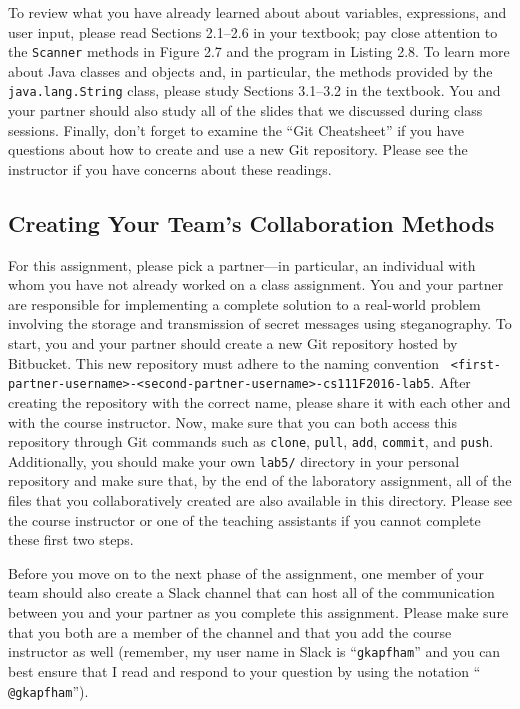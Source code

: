 To review what you have already learned about about variables, expressions, and user input, please read Sections
2.1--2.6 in your textbook; pay close attention to the {\tt Scanner} methods in Figure 2.7 and the program in Listing
2.8. To learn more about Java classes and objects and, in particular, the methods provided by the {\tt java.lang.String}
class, please study Sections 3.1--3.2 in the textbook. You and your partner should also study all of the slides that we
discussed during class sessions. Finally, don't forget to examine the ``Git Cheatsheet'' if you have questions about how
to create and use a new Git repository. Please see the instructor if you have concerns about these readings.

\vspace{-0.05in}
\subsection*{Creating Your Team's Collaboration Methods}
\vspace{-0.05in}

For this assignment, please pick a partner---in particular, an individual with whom you have not already worked on a class
assignment. You and your partner are responsible for implementing a complete solution to a real-world problem involving
the storage and transmission of secret messages using steganography. To start, you and your partner should create a new
Git repository hosted by Bitbucket. This new repository must adhere to the naming convention {\tt
<first-partner-username>-<second-partner-username>-cs111F2016-lab5}. After creating the repository with the correct
name, please share it with each other and with the course instructor. Now, make sure that you can both access this
repository through Git commands such as {\tt clone}, {\tt pull}, {\tt add}, {\tt commit}, and {\tt push}. Additionally,
you should make your own {\tt lab5/} directory in your personal repository and make sure that, by the end of the
laboratory assignment, all of the files that you collaboratively created are also available in this directory. Please
see the course instructor or one of the teaching assistants if you cannot complete these first two steps.

Before you move on to the next phase of the assignment, one member of your team should also create a Slack channel that
can host all of the communication between you and your partner as you complete this assignment. Please make sure that
you both are a member of the channel and that you add the course instructor as well (remember, my user name in Slack is
``{\tt gkapfham}'' and you can best ensure that I read and respond to your question by using the notation ``{\tt
@gkapfham}'').

